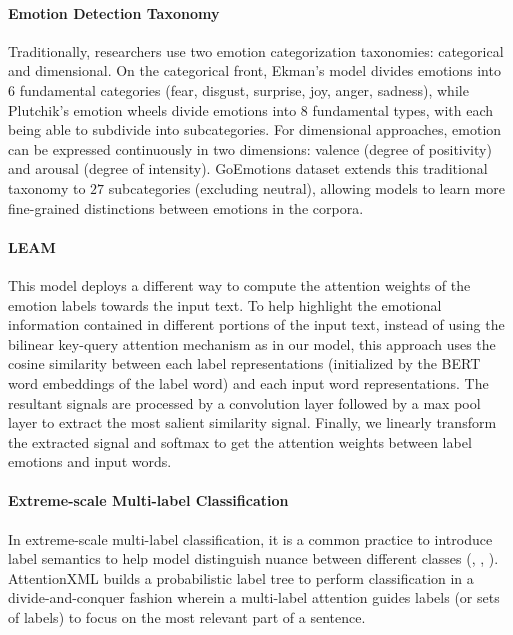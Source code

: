 
\paragraph{Emotion Detection Taxonomy}
Traditionally, researchers use two emotion categorization taxonomies: categorical and dimensional. On the categorical front, Ekman's model divides emotions into 6 fundamental categories (fear, disgust, surprise, joy, anger, sadness), while Plutchik's emotion wheels divide emotions into 8 fundamental types, with each being able to subdivide into subcategories. For dimensional approaches, emotion can be expressed continuously in two dimensions: valence (degree of positivity) and arousal (degree of intensity). GoEmotions dataset extends this traditional taxonomy to $27$ subcategories (excluding neutral), allowing models to learn more fine-grained distinctions between emotions in the corpora. 


\paragraph{LEAM} 
This model \citet{gaonkar2020modeling} deploys a different way to compute the attention weights of the emotion labels towards the input text. To help highlight the emotional information contained in different portions of the input text, instead of using the bilinear key-query attention mechanism as in our model, this approach uses the cosine similarity between each label representations (initialized by the BERT word embeddings of the label word) and each input word representations. The resultant signals are processed by a convolution layer followed by a max pool layer to extract the most salient similarity signal. Finally, we linearly transform the extracted signal and softmax to get the attention weights between label emotions and input words.

\paragraph{Extreme-scale Multi-label Classification}
In extreme-scale multi-label classification, it is a common practice to introduce label semantics to help model distinguish nuance between different classes (\citet{zhang2018deep}, \citet{you2019attentionxml}, \citet{chang2020taming}). AttentionXML builds a probabilistic label tree to perform classification in a divide-and-conquer fashion wherein a multi-label attention guides labels (or sets of labels) to focus on the most relevant part of a sentence. 

